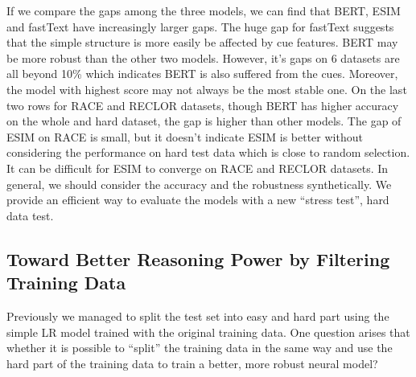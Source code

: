 If we compare the gaps among the three models, 
we can find that BERT, ESIM and fastText have increasingly larger gaps.
The huge gap for fastText 
suggests that the simple 
structure is more easily be affected by cue features.
BERT may be more robust than the other two models. However, it's gaps on 6 datasets 
are all beyond 10\% which indicates BERT is also suffered from the cues. Moreover, the model with 
highest score may not always be the most stable one. On the last two rows for RACE and RECLOR 
datasets, though BERT has higher accuracy on the whole and hard dataset, 
the gap is higher than other models. The gap of ESIM on RACE is small, but it doesn't  
indicate ESIM is better without considering the performance on hard test data which 
is close to random selection. 
It can be difficult for ESIM to converge on RACE and RECLOR
datasets. 
In general, we should consider the accuracy and the robustness 
synthetically. We provide an efficient way to evaluate the models with a new ``stress test'', hard data test. 

\subsection{Toward Better Reasoning Power by Filtering Training Data}
\label{sec:experiment3}
%
Previously we managed to split the test set into easy and hard part using
the simple LR model trained with the original training data.
One question arises that whether it is possible to ``split'' the training
data in the same way and use the hard part of the training data to
train a better, more robust neural model?

